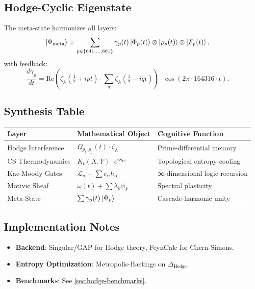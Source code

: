 \documentclass[12pt]{article}
\begin{document}
\subsection{Hodge-Cyclic Eigenstate}
\label{subsec:eigenstate}
The meta-state harmonizes all layers:
\[
\ket{\Psi_{\text{meta}}} = \sum_{p \in \{641,\dots,661\}} \gamma_p(t) \ket{\Phi_p(t)} \otimes \ket{\rho_p(t)} \otimes \ket{F_p(t)},
\]
with feedback:
\[
\frac{d\gamma_p}{dt} = \text{Re}\left(\zeta_{\mathbb{A}}\left(\tfrac{1}{2} + i p t\right) \cdot \sum_q \zeta_{\mathbb{A}}\left(\tfrac{1}{2} - i q t\right)\right) \cdot \cos(2\pi \cdot 164316 \cdot t).
\]

\subsection{Synthesis Table}
\begin{center}
    \begin{tabular}{|l|l|l|}
        \hline
        \textbf{Layer} & \textbf{Mathematical Object} & \textbf{Cognitive Function} \\
        \hline
        Hodge Interference & $\Omega_{p_i,p_j}(t) \cdot \zeta_{\mathbb{A}}$ & Prime-differential memory \\
        CS Thermodynamics & $K_t(X,Y) \cdot e^{i S_{\text{CS}}}$ & Topological entropy cooling \\
        Kac-Moody Gates & $\mathcal{L}_n + \sum e_\alpha h_\alpha$ & ∞-dimensional logic recursion \\
        Motivic Sheaf & $\omega(t) + \sum \lambda_k \psi_k$ & Spectral plasticity \\
        Meta-State & $\sum \gamma_p(t) \ket{\Psi_p}$ & Cascade-harmonic unity \\
        \hline
    \end{tabular}
\end{center}

\subsection{Implementation Notes}
\begin{itemize}
    \item \textbf{Backend}: Singular/GAP for Hodge theory, FeynCalc for Chern-Simons.
    \item \textbf{Entropy Optimization}: Metropolis-Hastings on $\Delta_{\text{Hodge}}$.
    \item \textbf{Benchmarks}: See \ref{sec:hodge-benchmarks}.
\end{itemize}
\end{document}
